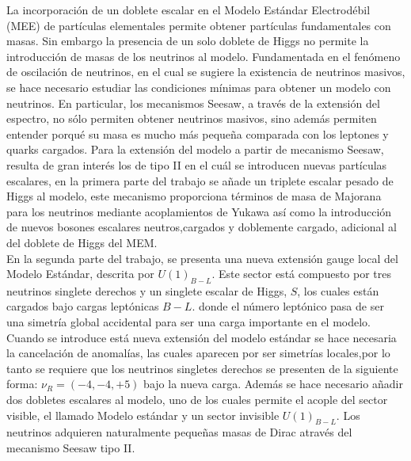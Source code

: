 \documentclass[12pt]{article}
\begin{document}
La incorporación de un doblete escalar en el Modelo Estándar
Electrodébil (MEE) de partículas elementales permite obtener partículas fundamentales con masas. Sin embargo la presencia de un solo doblete de Higgs no permite la introducción de masas de los neutrinos al modelo. Fundamentada en el fenómeno de oscilación de neutrinos, en el cual se sugiere la existencia de neutrinos masivos, se hace necesario estudiar las condiciones mínimas para obtener un modelo con neutrinos. En particular, los mecanismos Seesaw, a través de la extensión del espectro, no sólo permiten obtener neutrinos masivos, sino además permiten entender porqué su masa es mucho más pequeña comparada con los leptones y quarks cargados. Para la extensión del modelo a partir de mecanismo Seesaw, resulta de gran interés los de tipo II en el cuál se introducen nuevas partículas escalares, en la primera parte del trabajo se añade un triplete escalar pesado de Higgs al modelo, este mecanismo proporciona términos de masa de Majorana para los neutrinos mediante acoplamientos de Yukawa así como la introducción de nuevos bosones escalares neutros,cargados y doblemente cargado,  adicional al del doblete de Higgs del MEM. \\

En la segunda parte del trabajo, se presenta una nueva extensión gauge local del Modelo Estándar, descrita por $U(1)_{B-L}$. Este sector está compuesto por tres neutrinos singlete derechos y un singlete escalar de Higgs, $S$, los cuales están cargados bajo cargas leptónicas ${B-L}$. donde el número leptónico pasa de ser una simetría global accidental para ser una carga importante en el modelo.  Cuando se introduce está nueva extensión del modelo estándar se hace necesaria la cancelación de anomalías, las cuales aparecen por ser simetrías locales,por lo tanto se requiere que los neutrinos singletes derechos se presenten de la siguiente forma: $\nu_R=(-4,-4,+5)$ bajo la nueva carga. Además se hace necesario añadir dos dobletes escalares al modelo, uno de los cuales permite el acople del sector visible, el llamado Modelo estándar y un sector invisible  $U(1)_{B-L}$. Los neutrinos adquieren naturalmente pequeñas masas de Dirac através del mecanismo Seesaw tipo II. 
\end{document}
